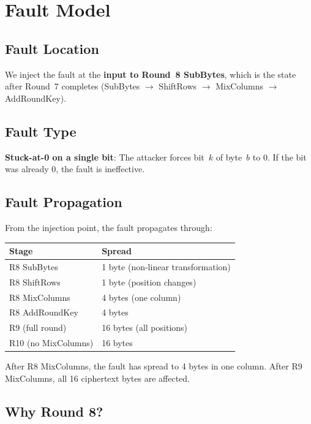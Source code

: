 \documentclass[11pt,a4paper]{article}
\begin{document}
\section{Fault Model}

\subsection{Fault Location}

We inject the fault at the \textbf{input to Round~8 SubBytes}, which is the state after Round~7 completes (SubBytes $\to$ ShiftRows $\to$ MixColumns $\to$ AddRoundKey).

\subsection{Fault Type}

\textbf{Stuck-at-0 on a single bit}: The attacker forces bit~$k$ of byte~$b$ to 0. If the bit was already 0, the fault is ineffective.

\subsection{Fault Propagation}

From the injection point, the fault propagates through:

\begin{center}
\begin{tabular}{ll}
\toprule
\textbf{Stage} & \textbf{Spread} \\
\midrule
R8 SubBytes & 1 byte (non-linear transformation) \\
R8 ShiftRows & 1 byte (position changes) \\
R8 MixColumns & 4 bytes (one column) \\
R8 AddRoundKey & 4 bytes \\
R9 (full round) & 16 bytes (all positions) \\
R10 (no MixColumns) & 16 bytes \\
\bottomrule
\end{tabular}
\end{center}

After R8 MixColumns, the fault has spread to 4 bytes in one column. After R9 MixColumns, all 16 ciphertext bytes are affected.

\subsection{Why Round 8?}
\end{document}
